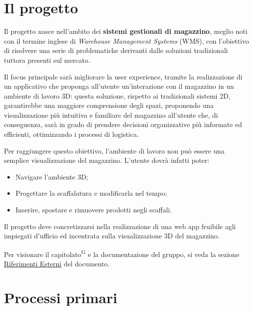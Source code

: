 \section{Il progetto}\label{sec:il_progetto}
\par Il progetto nasce nell'ambito dei \textbf{sistemi gestionali di magazzino}, meglio noti con il termine inglese di \textit{Warehouse Management Systems} (WMS), con l'obiettivo di risolvere una serie di problematiche derivanti dalle soluzioni tradizionali tuttora presenti sul mercato.
\par Il focus principale sarà migliorare la user experience, tramite la realizzazione di un applicativo che proponga all'utente un'interazione con il magazzino in un ambiente di lavoro 3D: questa soluzione, rispetto ai tradizionali sistemi 2D, garantirebbe una maggiore comprensione degli spazi, proponendo una visualizzazione più intuitiva e familiare del magazzino all'utente che, di conseguenza, sarà in grado di prendere decisioni organizzative più informate ed efficienti, ottimizzando i processi di logistica.
\par Per raggiungere questo obiettivo, l'ambiente di lavoro non può essere una semplice visualizzazione del magazzino. L'utente dovrà infatti poter:
\begin{itemize}
    \item Navigare l'ambiente 3D;
    \item Progettare la scaffalatura e modificarla nel tempo;
    \item Inserire, spostare e rimuovere prodotti negli scaffali.
\end{itemize}
Il progetto deve concretizzarsi nella realizzazione di una web app fruibile agli impiegati d'ufficio ed incentrata sulla visualizzazione 3D del magazzino.
\par Per visionare il capitolato\textsuperscript{G} e la documentazione del gruppo, si veda la sezione \hyperref[sec:riferimenti_esterni]{Riferimenti Esterni} del documento.

\newpage
\section{Processi primari}\label{sec:processi_primari}
